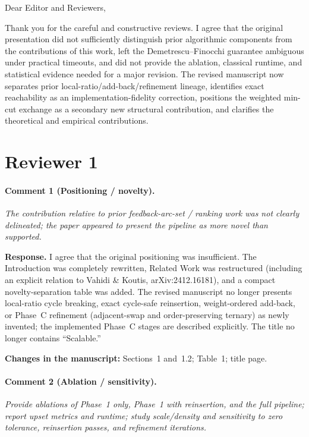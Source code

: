 \documentclass[11pt]{article}
\newcommand{\commentbox}[1]{\par\textit{#1}\par\medskip}
\newcommand{\changes}[1]{\textbf{Changes in the manuscript:} #1\par\medskip}
\begin{document}
Dear Editor and Reviewers,

Thank you for the careful and constructive reviews. I agree that the original presentation did not sufficiently distinguish prior algorithmic components from the contributions of this work, left the Demetrescu--Finocchi guarantee ambiguous under practical timeouts, and did not provide the ablation, classical runtime, and statistical evidence needed for a major revision. The revised manuscript now separates prior local-ratio/add-back/refinement lineage, identifies exact reachability as an implementation-fidelity correction, positions the weighted min-cut exchange as a secondary new structural contribution, and clarifies the theoretical and empirical contributions.

\section*{Reviewer 1}

\paragraph{Comment 1 (Positioning / novelty).}
\commentbox{The contribution relative to prior feedback-arc-set / ranking work was not clearly delineated; the paper appeared to present the pipeline as more novel than supported.}

\noindent\textbf{Response.}
I agree that the original positioning was insufficient. The Introduction was completely rewritten, Related Work was restructured (including an explicit relation to Vahidi \& Koutis, arXiv:2412.16181), and a compact novelty-separation table was added. The revised manuscript no longer presents local-ratio cycle breaking, exact cycle-safe reinsertion, weight-ordered add-back, or Phase~C refinement (adjacent-swap and order-preserving ternary) as newly invented; the implemented Phase~C stages are described explicitly. The title no longer contains ``Scalable.''

\changes{Sections~1 and~1.2; Table~1; title page.}

\paragraph{Comment 2 (Ablation / sensitivity).}
\commentbox{Provide ablations of Phase~1 only, Phase~1 with reinsertion, and the full pipeline; report upset metrics and runtime; study scale/density and sensitivity to zero tolerance, reinsertion passes, and refinement iterations.}
\end{document}
